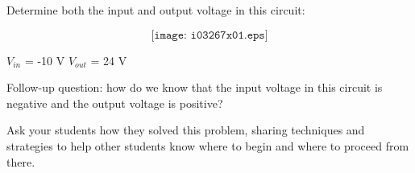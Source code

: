 

Determine both the input and output voltage in this circuit:

$$\texttt{[image: i03267x01.eps]}$$







$V_{in}$ = -10 V \hskip 30pt $V_{out}$ = 24 V

\vskip 10pt

Follow-up question: how do we know that the input voltage in this circuit is negative and the output voltage is positive?







Ask your students how they solved this problem, sharing techniques and strategies to help other students know where to begin and where to proceed from there.




